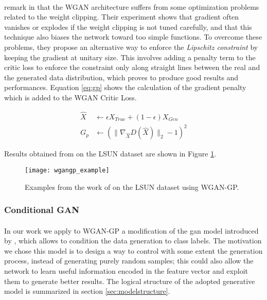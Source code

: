 \paragraph{} \citeauthor{wgangp} remark in \cite{wgangp} that the WGAN architecture suffers from some optimization problems related to the weight clipping. Their experiment shows that gradient often vanishes or explodes if the weight clipping is not tuned carefully, and that this technique also biases the network toward too simple functions. To overcome these problems, they propose an alternative way to enforce the \textit{Lipschitz constraint} by keeping the gradient at unitary size. This involves adding a penalty term to the critic loss to enforce the constraint only along straight lines between the real and the generated data distribution, which proves to produce good results and performances.
Equation \ref{eq:gp} shows the calculation of the gradient penalty which is added to the WGAN Critic Loss.

\begin{equation}
\label{eq:gp}
\begin{split}
\hat{X} & \gets \epsilon X_{True} + (1-\epsilon) X_{Gen} \\
G_p & \gets (\| \nabla_{\hat{X}}D(\hat{X}) \|_2 - 1 )^2
\end{split}
\end{equation}

Results obtained from \citeauthor{wgangp} on the LSUN dataset are shown in Figure \ref{fig:wgangp}.
\begin{figure}[h!]
	\begin{center}
		\texttt{[image: wgangp\_example]}
	\end{center}
	
	\captionsetup{width=1\linewidth}
	\caption[Samples from WGAN-GP, \citeauthor{wgangp}]{Examples from the work of \citeauthor{wgangp} on the LSUN dataset using WGAN-GP. \cite[p.8]{wgangp}}
	\label{fig:wgangp}
	\medskip
\end{figure}

\FloatBarrier

\subsubsection{Conditional GAN}
\paragraph{} In our work we apply to WGAN-GP a modification of the \gls{gan} model introduced by \citeauthor{conditionalgan} \cite{conditionalgan} , which allows to condition the data generation to class labels. The motivation we chose this model is to design a way to control with some extent the generation process, instead of generating purely random samples; this could also allow the network to learn useful information encoded in the feature vector and exploit them to generate better results. The logical structure of the adopted generative model is summarized in section \ref{sec:modelstructure}.


